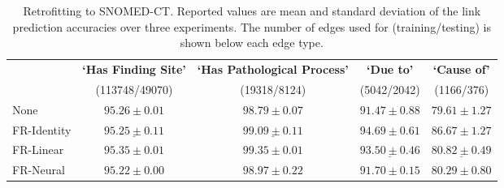 \documentclass[11pt, a4paper]{article}
\begin{document}
\begin{table*}[htp]
	\centering
	\setlength{\tabcolsep}{8pt}
    \begin{adjustbox}{center}
    \begin{tabular}{l c c c c}
        \toprule
         &  \bf{`Has Finding Site'} & \bf{`Has Pathological Process'} & \bf{`Due to'} & \bf{`Cause of'}\\
                      & (113748/49070)          & (19318/8124)                    & (5042/2042)   & (1166/376) \\
        \midrule 
        None          & $95.26\pm0.01$                    & $98.79\pm0.07$                       & $91.47\pm0.88$              & $79.61\pm1.27$      \\
        FR-Identity      &  $\underline{95.25\pm0.11}$    & $\underline{99.09\pm0.11}$                   & $\boldsymbol{94.69\pm0.61}$ & $\boldsymbol{86.67\pm1.27}$ \\
        FR-Linear        & $\boldsymbol{95.35\pm0.01}$       & $\boldsymbol{99.35\pm0.01}$      & $\underline{93.50\pm0.46}$              & $\underline{80.82\pm0.49}$      \\
        FR-Neural        & $95.22\pm0.00$                        & $98.97\pm0.22$                                & $91.70\pm0.15$              & $80.29\pm0.80$      \\
    \bottomrule
    \end{tabular}
    \end{adjustbox}
    \caption{Retrofitting to SNOMED-CT. Reported values are mean and standard deviation of the link prediction accuracies over three experiments. The number of edges used for (training/testing) is shown below each edge type.}
    \label{tab:snomed}
\end{table*}
\end{document}
